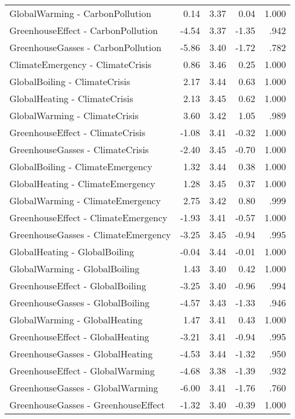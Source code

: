 \begin{table}[ht]
\begin{tabular}{lrrrr}
  GlobalWarming - CarbonPollution & 0.14 & 3.37 & 0.04 & 1.000 \\ 
  GreenhouseEffect - CarbonPollution & -4.54 & 3.37 & -1.35 & .942 \\ 
  GreenhouseGasses - CarbonPollution & -5.86 & 3.40 & -1.72 & .782 \\ 
  ClimateEmergency - ClimateCrisis & 0.86 & 3.46 & 0.25 & 1.000 \\ 
  GlobalBoiling - ClimateCrisis & 2.17 & 3.44 & 0.63 & 1.000 \\ 
  GlobalHeating - ClimateCrisis & 2.13 & 3.45 & 0.62 & 1.000 \\ 
  GlobalWarming - ClimateCrisis & 3.60 & 3.42 & 1.05 & .989 \\ 
  GreenhouseEffect - ClimateCrisis & -1.08 & 3.41 & -0.32 & 1.000 \\ 
  GreenhouseGasses - ClimateCrisis & -2.40 & 3.45 & -0.70 & 1.000 \\ 
  GlobalBoiling - ClimateEmergency & 1.32 & 3.44 & 0.38 & 1.000 \\ 
  GlobalHeating - ClimateEmergency & 1.28 & 3.45 & 0.37 & 1.000 \\ 
  GlobalWarming - ClimateEmergency & 2.75 & 3.42 & 0.80 & .999 \\ 
  GreenhouseEffect - ClimateEmergency & -1.93 & 3.41 & -0.57 & 1.000 \\ 
  GreenhouseGasses - ClimateEmergency & -3.25 & 3.45 & -0.94 & .995 \\ 
  GlobalHeating - GlobalBoiling & -0.04 & 3.44 & -0.01 & 1.000 \\ 
  GlobalWarming - GlobalBoiling & 1.43 & 3.40 & 0.42 & 1.000 \\ 
  GreenhouseEffect - GlobalBoiling & -3.25 & 3.40 & -0.96 & .994 \\ 
  GreenhouseGasses - GlobalBoiling & -4.57 & 3.43 & -1.33 & .946 \\ 
  GlobalWarming - GlobalHeating & 1.47 & 3.41 & 0.43 & 1.000 \\ 
  GreenhouseEffect - GlobalHeating & -3.21 & 3.41 & -0.94 & .995 \\ 
  GreenhouseGasses - GlobalHeating & -4.53 & 3.44 & -1.32 & .950 \\ 
  GreenhouseEffect - GlobalWarming & -4.68 & 3.38 & -1.39 & .932 \\ 
  GreenhouseGasses - GlobalWarming & -6.00 & 3.41 & -1.76 & .760 \\ 
  GreenhouseGasses - GreenhouseEffect & -1.32 & 3.40 & -0.39 & 1.000 \\ 
   \hline
\end{tabular}
\end{table}
